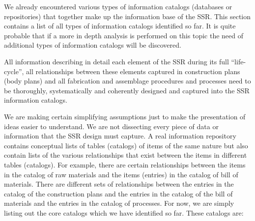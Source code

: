 We already encountered various types of information catalogs (databases
or repositories) that together make up the information base of the SSR.
This section contains a list of all types of information catalogs
identified so far. It is quite probable that if a more in depth
analysis is performed on this topic the need of additional types of
information catalogs will be discovered.

All information describing in detail each element of the SSR during its
full “life-cycle”, all relationships between these elements captured in
construction plans (body plans) and all fabrication and assemblage
procedures and processes need to be thoroughly, systematically and
coherently designed and captured into the SSR information catalogs.

We are making certain simplifying assumptions just to make the
presentation of ideas easier to understand. We are not dissecting
every piece of data or information that the SSR design must capture.
A real information repository contains
conceptual lists of tables (catalogs) of items of the same nature but
also contain lists of the various relationships that exist between the
items in different tables (catalogs).  For example, there are certain
relationships between the items in the catalog of raw materials and the
items (entries) in the catalog of bill of materials. There are
different sets of relationships between the entries in the catalog of
the construction plans and the entries in the catalog of the bill of
materials and the entries in the catalog of processes.  For now, we are
simply listing out the core catalogs which we have identified so far. 
These catalogs are:

